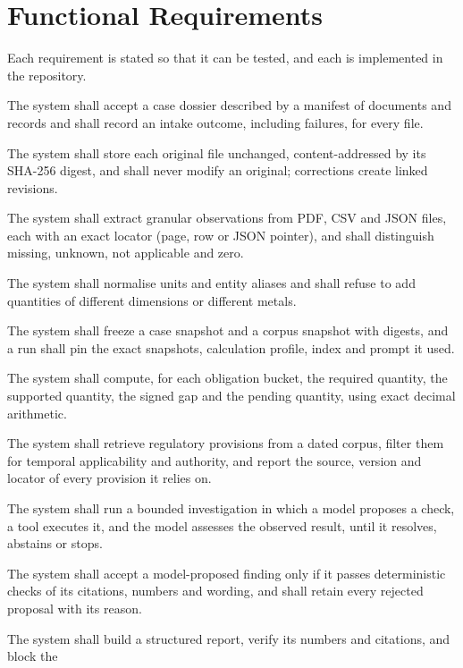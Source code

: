 \section{Functional Requirements}
\label{sec:fr}
Each requirement is stated so that it can be tested, and each is implemented in the repository.
\begin{description}[itemsep=2pt,font=\normalfont\bfseries,leftmargin=1.2cm,labelwidth=1cm]
\item[FR1] The system shall accept a case dossier described by a manifest of documents and records and
           shall record an intake outcome, including failures, for every file.
\item[FR2] The system shall store each original file unchanged, content-addressed by its SHA-256 digest,
           and shall never modify an original; corrections create linked revisions.
\item[FR3] The system shall extract granular observations from PDF, CSV and JSON files, each with an exact
           locator (page, row or JSON pointer), and shall distinguish missing, unknown, not applicable and zero.
\item[FR4] The system shall normalise units and entity aliases and shall refuse to add quantities of
           different dimensions or different metals.
\item[FR5] The system shall freeze a case snapshot and a corpus snapshot with digests, and a run shall pin
           the exact snapshots, calculation profile, index and prompt it used.
\item[FR6] The system shall compute, for each obligation bucket, the required quantity, the supported
           quantity, the signed gap and the pending quantity, using exact decimal arithmetic.
\item[FR7] The system shall retrieve regulatory provisions from a dated corpus, filter them for
           temporal applicability and authority, and report the source, version and locator of every
           provision it relies on.
\item[FR8] The system shall run a bounded investigation in which a model proposes a check, a tool executes
           it, and the model assesses the observed result, until it resolves, abstains or stops.
\item[FR9] The system shall accept a model-proposed finding only if it passes deterministic checks of its
           citations, numbers and wording, and shall retain every rejected proposal with its reason.
\item[FR10] The system shall build a structured report, verify its numbers and citations, and block the

\end{description}
